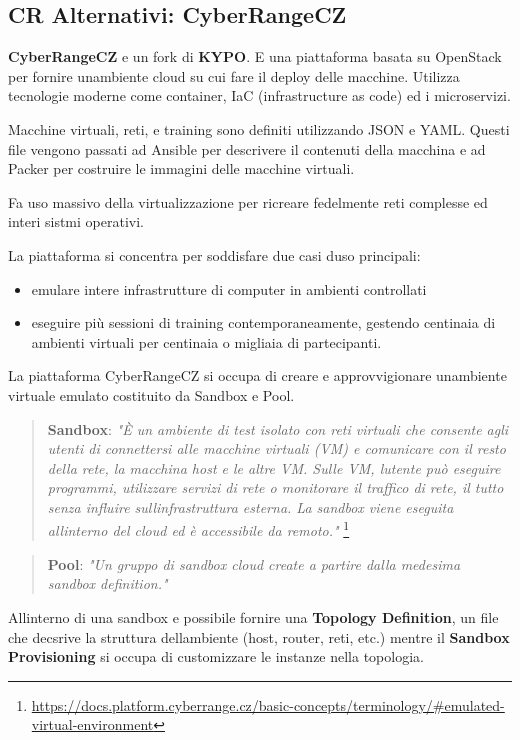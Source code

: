 \subsection{CR Alternativi:
CyberRangeCZ}\label{cr-alternativi-cyberrangecz}

\textbf{CyberRangeCZ} e\textquotesingle{} un fork di \textbf{KYPO}.
E\textquotesingle{} una piattaforma basata su OpenStack per fornire
un\textquotesingle ambiente cloud su cui fare il deploy delle macchine.
Utilizza tecnologie moderne come container, IaC (infrastructure as code)
ed i microservizi.

Macchine virtuali, reti, e training sono definiti utilizzando JSON e
YAML. Questi file vengono passati ad Ansible per descrivere il contenuti
della macchina e ad Packer per costruire le immagini delle macchine
virtuali.

Fa uso massivo della virtualizzazione per ricreare fedelmente reti
complesse ed interi sistmi operativi.

La piattaforma si concentra per soddisfare due casi
d\textquotesingle uso principali:

\begin{itemize}
\tightlist
\item
  emulare intere infrastrutture di computer in ambienti controllati
\item
  eseguire più sessioni di training contemporaneamente, gestendo
  centinaia di ambienti virtuali per centinaia o migliaia di
  partecipanti.
\end{itemize}

La piattaforma CyberRangeCZ si occupa di creare e approvvigionare
un\textquotesingle ambiente virtuale emulato costituito da Sandbox e
Pool.

\begin{quote}
\textbf{Sandbox}: \emph{"È un ambiente di test isolato con reti virtuali
che consente agli utenti di connettersi alle macchine virtuali (VM) e
comunicare con il resto della rete, la macchina host e le altre VM.
Sulle VM, l\textquotesingle utente può eseguire programmi, utilizzare
servizi di rete o monitorare il traffico di rete, il tutto senza
influire sull\textquotesingle infrastruttura esterna. La sandbox viene
eseguita all\textquotesingle interno del cloud ed è accessibile da
remoto."} \footnote{\label{fn:ref_13}\url{https://docs.platform.cyberrange.cz/basic-concepts/terminology/\#emulated-virtual-environment}}
\end{quote}

\begin{quote}
\textbf{Pool}: \emph{"Un gruppo di sandbox cloud create a partire dalla
medesima sandbox definition."} 
\end{quote}

All\textquotesingle interno di una sandbox e\textquotesingle{} possibile
fornire una \textbf{Topology Definition}, un file che decsrive la
struttura dell\textquotesingle ambiente (host, router, reti, etc.)
mentre il \textbf{Sandbox Provisioning} si occupa di customizzare le
instanze nella topologia.
